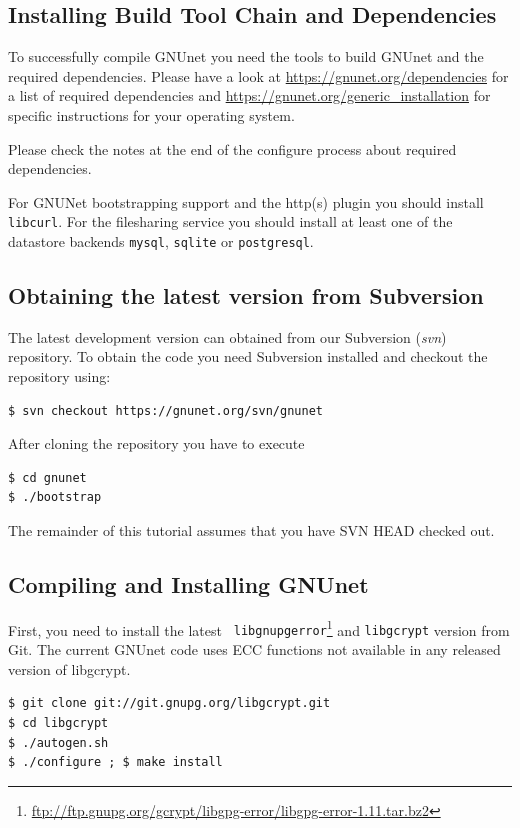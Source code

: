\documentclass[10pt]{article}
\begin{document}
\subsection{Installing Build Tool Chain and Dependencies}
To successfully compile GNUnet you need the tools to build GNUnet and the required dependencies.
Please have a look at \url{https://gnunet.org/dependencies} for a list of required dependencies 
and \url{https://gnunet.org/generic_installation} for specific instructions for your operating system.

Please check the notes at the end of the configure process about required dependencies.

For GNUNet bootstrapping support and the http(s) plugin you should install \texttt{libcurl}.
For the filesharing service you should install at least one of the datastore backends \texttt{mysql}, 
\texttt{sqlite} or \texttt{postgresql}.

\subsection{Obtaining the latest version from Subversion}
The latest development version can obtained from our Subversion (\textit{svn}) repository. To obtain 
the code you need Subversion installed and checkout the repository using:
\lstset{language=bash}
\begin{lstlisting}
$ svn checkout https://gnunet.org/svn/gnunet
\end{lstlisting}
After cloning the repository you have to execute
\lstset{language=bash}
\begin{lstlisting}
$ cd gnunet
$ ./bootstrap
\end{lstlisting}

The remainder of this tutorial assumes that you have SVN HEAD checked out.

\subsection{Compiling and Installing GNUnet}

First, you need to install the latest {\tt
  libgnupgerror}\footnote{\url{ftp://ftp.gnupg.org/gcrypt/libgpg-error/libgpg-error-1.11.tar.bz2}}
and {\tt libgcrypt} version from Git.  The current GNUnet code uses
ECC functions not available in any released version of libgcrypt.

\lstset{language=bash}
\begin{lstlisting}
$ git clone git://git.gnupg.org/libgcrypt.git
$ cd libgcrypt
$ ./autogen.sh
$ ./configure ; $ make install 
\end{lstlisting}
\end{document}
